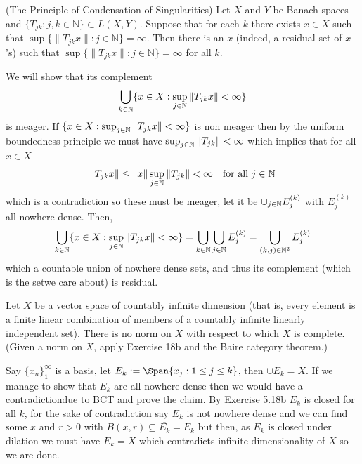 \documentclass[12pt,a4paper]{article}
\begin{document}
\begin{problem}\label{prob:5-40}
(The Principle of Condensation of Singularities) Let $X$ and $Y$ be Banach spaces and $\{T_{jk} : j,k \in \mathbb{N}\} \subset L(X,Y)$. Suppose that for each $k$ there exists $x \in X$ such that $\sup \{ \|T_{jk}x\| : j \in \mathbb{N}\} = \infty$. Then there is an $x$ (indeed, a residual set of $x$'s) such that $\sup \{ \|T_{jk}x\| : j \in \mathbb{N} \} = \infty$ for all $k$.
\end{problem}
\begin{solution}
    We will show that its complement
    \[
        \bigcup_{k\in\mathbb{N}}\{x\in X:\sup_{j\in\mathbb{N}}\|T_{jk}x\|<\infty\}
    \]
    is meager. 
    If $\{x\in X:\sup_{j\in\mathbb{N}}\|T_{jk}x\|<\infty\}$ is non meager then by the uniform boundedness principle we must have $\sup_{j\in\mathbb{N}}\|T_{jk}\|<\infty$ which implies that for all $x\in X$ 
    \[
        \|T_{jk}x\|\leq\|x\|\sup_{j\in\mathbb{N}}\|T_{jk}\|<\infty\quad\text{for all }j\in\mathbb{N}
    \]
    which is a contradiction so these must be meager, let it be $\cup_{j\in\mathbb{N}} E_j^{(k)}$ with $E_j^{(k)}$ all nowhere dense. 
    Then, 
    \[
        \bigcup_{k\in\mathbb{N}}\{x\in X:\sup_{j\in\mathbb{N}}\|T_{jk}x\|<\infty\}=\bigcup_{k\in\mathbb{N}}\bigcup_{j\in\mathbb{N}}E_j^{(k)}=\bigcup_{(k,j)\in\mathbb{N}^2}E_j^{(k)}
    \]
    which a countable union of nowhere dense sets, and thus its complement (which is the setwe care about) is residual. 
\end{solution}
\begin{problem}\label{prob:5-41}
Let $X$ be a vector space of countably infinite dimension (that is, every element is a finite linear combination of members of a countably infinite linearly independent set). There is no norm on $X$ with respect to which $X$ is complete. (Given a norm on $X$, apply Exercise 18b and the Baire category theorem.)
\end{problem}
\begin{solution}
    Say $\{x_n\}_1^\infty$ is a basis, let $E_k:=\Span \qty{x_j:1\leq j\leq k}$, then $\cup E_k=X.$ 
    If we manage to show that $E_k$ are all nowhere dense then we would have a contradictiondue to BCT and prove the claim. 
    By \hyperref[prob:5-18]{Exercise 5.18b} $E_k$ is closed for all $k$, for the sake of contradiction say $E_k$ is not nowhere dense and we can find some $x$ and $r>0$ with $B(x,r) \subseteq \overline{E_k}=E_k$ but then, as $E_k$ is closed under dilation we must have $E_k=X$ which contradicts infinite dimensionality of $X$ so we are done. 
\end{solution}
\end{document}
